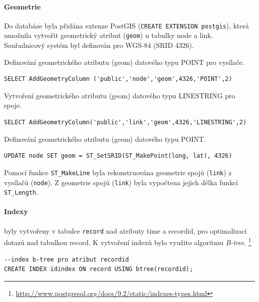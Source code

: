 \documentclass[a4paper,12pt,oneside]{report}
\begin{document}
\paragraph*{Geometrie} Do databáze byla přidána extenze PostGIS
(\texttt{CREATE EXTENSION postgis}), která umožnila vytvořit
geometrický atribut (\texttt{geom}) u tabulky node a
link. Souřadnicový systém byl definován pro WGS-84 (SRID 4326).

Definování geometrického atributu (geom) datového typu POINT pro
vysílače.

\begin{footnotesize}
\begin{lstlisting}[style=mybash]
SELECT AddGeometryColumn ('public','node','geom',4326,'POINT',2)
\end{lstlisting}
\end{footnotesize}

Vytvoření geometrického atributu (geom) datového typu LINESTRING pro spoje. 

\begin{footnotesize}
\begin{lstlisting}[style=mybash]
SELECT AddGeometryColumn('public','link','geom',4326,'LINESTRING',2)
\end{lstlisting}
\end{footnotesize}

Definování geometrického atributu (geom) datového typu POINT. 

\begin{footnotesize}
\begin{lstlisting}[style=mybash]
UPDATE node SET geom = ST_SetSRID(ST_MakePoint(long, lat), 4326)
\end{lstlisting}
\end{footnotesize}

Pomocí funkce \texttt{ST\_MakeLine} byla rekonstruována geometrie
spojů (\texttt{link}) z vysílačů (\texttt{node}). Z geometrie spojů
(\texttt{link}) byla vypočtena jejich délka funkcí
\texttt{ST\_Length}.

\paragraph*{Indexy} byly vytvořeny v tabulce \texttt{record} nad
atributy time a recordid, pro optimalizaci dotazů nad tabulkou
record. K vytvoření indexů bylo využito algoritmu
\textit{B-tree}. \footnote{\url{http://www.postgresql.org/docs/9.2/static/indexes-types.html}}

\begin{footnotesize}
\begin{lstlisting}[style=mybash]
--index b-tree pro atribut recordid
CREATE INDEX idindex ON record USING btree(recordid);		
\end{lstlisting}
\end{footnotesize}
\end{document}
